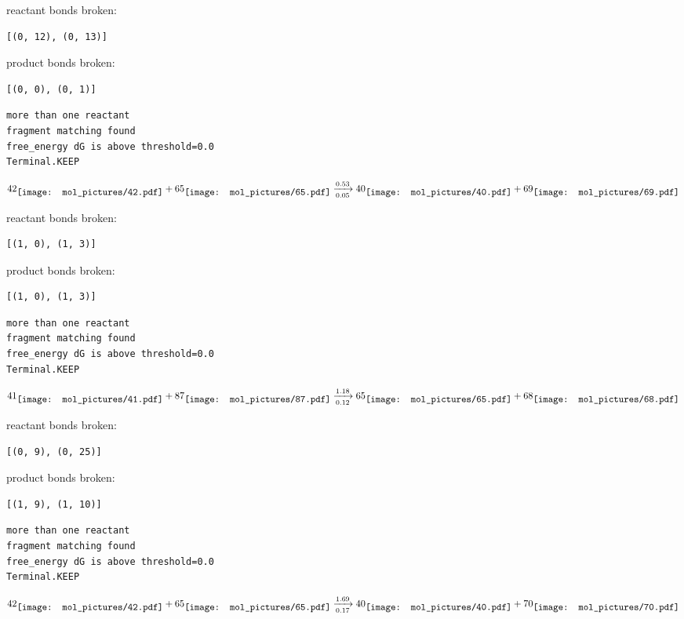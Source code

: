 \documentclass{article}
\begin{document}
reactant bonds broken:\begin{verbatim}
[(0, 12), (0, 13)]
\end{verbatim}
product bonds broken:\begin{verbatim}
[(0, 0), (0, 1)]
\end{verbatim}




\vspace{1cm}
\begin{verbatim}
more than one reactant
fragment matching found
free_energy dG is above threshold=0.0
Terminal.KEEP
\end{verbatim}
$$
42
\raisebox{-.5\height}{\texttt{[image: mol\_pictures/42.pdf]}}
+
65
\raisebox{-.5\height}{\texttt{[image: mol\_pictures/65.pdf]}}
\xrightarrow[0.05]{0.53}
40
\raisebox{-.5\height}{\texttt{[image: mol\_pictures/40.pdf]}}
+
69
\raisebox{-.5\height}{\texttt{[image: mol\_pictures/69.pdf]}}
$$


reactant bonds broken:\begin{verbatim}
[(1, 0), (1, 3)]
\end{verbatim}
product bonds broken:\begin{verbatim}
[(1, 0), (1, 3)]
\end{verbatim}




\vspace{1cm}
\begin{verbatim}
more than one reactant
fragment matching found
free_energy dG is above threshold=0.0
Terminal.KEEP
\end{verbatim}
$$
41
\raisebox{-.5\height}{\texttt{[image: mol\_pictures/41.pdf]}}
+
87
\raisebox{-.5\height}{\texttt{[image: mol\_pictures/87.pdf]}}
\xrightarrow[0.12]{1.18}
65
\raisebox{-.5\height}{\texttt{[image: mol\_pictures/65.pdf]}}
+
68
\raisebox{-.5\height}{\texttt{[image: mol\_pictures/68.pdf]}}
$$


reactant bonds broken:\begin{verbatim}
[(0, 9), (0, 25)]
\end{verbatim}
product bonds broken:\begin{verbatim}
[(1, 9), (1, 10)]
\end{verbatim}




\vspace{1cm}
\begin{verbatim}
more than one reactant
fragment matching found
free_energy dG is above threshold=0.0
Terminal.KEEP
\end{verbatim}
$$
42
\raisebox{-.5\height}{\texttt{[image: mol\_pictures/42.pdf]}}
+
65
\raisebox{-.5\height}{\texttt{[image: mol\_pictures/65.pdf]}}
\xrightarrow[0.17]{1.69}
40
\raisebox{-.5\height}{\texttt{[image: mol\_pictures/40.pdf]}}
+
70
\raisebox{-.5\height}{\texttt{[image: mol\_pictures/70.pdf]}}
$$
\end{document}
